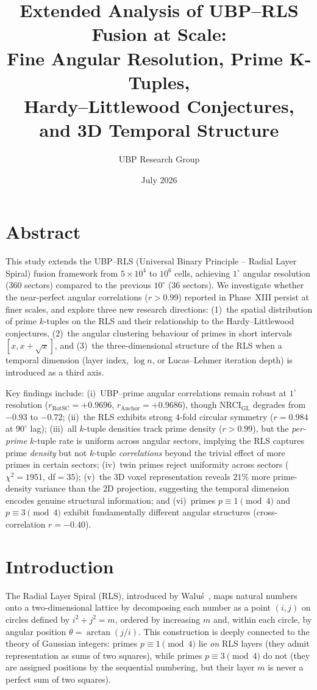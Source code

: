\documentclass[11pt,a4paper]{article}
\title{Extended Analysis of UBP--RLS Fusion at Scale:\\
Fine Angular Resolution, Prime K-Tuples,\\
Hardy--Littlewood Conjectures, and 3D Temporal Structure}
\author{UBP Research Group}
\date{July 2026}
\theoremstyle{definition}
\begin{document}
\section*{Abstract}

This study extends the UBP--RLS (Universal Binary Principle -- Radial Layer Spiral)
fusion framework from $5\times10^4$ to $10^6$ cells, achieving $1^{\circ}$ angular
resolution (360 sectors) compared to the previous $10^{\circ}$ (36 sectors).
We investigate whether the near-perfect angular correlations ($r > 0.99$)
reported in Phase~XIII persist at finer scales, and explore three new research
directions: (1)~the spatial distribution of prime $k$-tuples on the RLS and their
relationship to the Hardy--Littlewood conjectures, (2)~the angular clustering
behaviour of primes in short intervals $[x, x+\sqrt{x}]$, and
(3)~the three-dimensional structure of the RLS when a temporal dimension
(layer index, $\log n$, or Lucas--Lehmer iteration depth) is introduced as a
third axis.

Key findings include: (i)~UBP--prime angular correlations remain robust at
$1^{\circ}$ resolution ($r_{\text{RotSC}} = +0.9696$, $r_{\text{Anchor}} = +0.9686$),
though NRCI$_{\text{GL}}$ degrades from $-0.93$ to $-0.72$; (ii)~the RLS
exhibits strong $4$-fold circular symmetry ($r = 0.984$ at $90^{\circ}$ lag);
(iii)~all $k$-tuple densities track prime density ($r > 0.99$), but the
\emph{per-prime} $k$-tuple rate is uniform across angular sectors, implying the
RLS captures prime \emph{density} but not $k$-tuple \emph{correlations} beyond the
trivial effect of more primes in certain sectors; (iv)~twin primes reject
uniformity across sectors ($\chi^2 = 1951$, df$=35$); (v)~the 3D voxel
representation reveals $21\%$ more prime-density variance than the 2D projection,
suggesting the temporal dimension encodes genuine structural information; and
(vi)~primes $p \equiv 1 \pmod{4}$ and $p \equiv 3 \pmod{4}$ exhibit
fundamentally different angular structures (cross-correlation $r = -0.40$).

\section{Introduction}
\label{sec:intro}

The Radial Layer Spiral (RLS), introduced by Walu\'{s}~\cite{walus2026}, maps
natural numbers onto a two-dimensional lattice by decomposing each number as a
point $(i, j)$ on circles defined by $i^2 + j^2 = m$, ordered by increasing $m$
and, within each circle, by angular position $\theta = \arctan(j/i)$.  This
construction is deeply connected to the theory of Gaussian integers: primes
$p \equiv 1 \pmod{4}$ lie \emph{on} RLS layers (they admit representation as
sums of two squares), while primes $p \equiv 3 \pmod{4}$ do not (they are
assigned positions by the sequential numbering, but their layer $m$ is never a
perfect sum of two squares).
\end{document}
